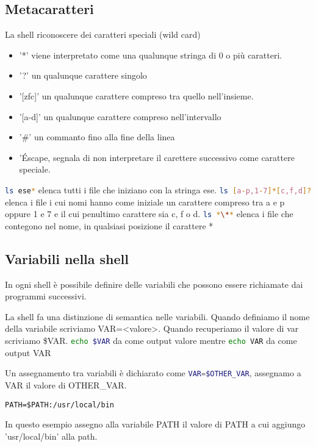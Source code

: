 \documentclass
[10pt,        %
 a4paper,     %
 onecolumn,   %
 fleqn,       %
 oneside,     %
 notitlepage, %
 openany      %
]{article}    %
\begin{document}
\subsection{Metacaratteri}
La shell riconoscere dei caratteri speciali (wild card)
\begin{itemize}
    \item '*' viene interpretato come una qualunque stringa di 0 o più caratteri.
    \item '?' un qualunque carattere singolo
    \item '[zfc]' un qualunque carattere compreso tra quello nell'insieme.
    \item '[a-d]' un qualunque carattere compreso nell'intervallo
    \item '\#' un commanto fino alla fine della linea
    \item '\' Escape, segnala di non interpretare il carettere successivo come carattere speciale. 
\end{itemize}
\lstinline[language=bash]!ls ese*! elenca tutti i file che iniziano con la stringa ese.
\lstinline[language=bash]!ls [a-p,1-7]*[c,f,d]?! elenca i file i cui nomi hanno come iniziale un carattere compreso tra a e p oppure 1 e 7 e il cui penultimo carattere sia c, f o d.
\lstinline[language=bash]!ls *\**! elenca i file che contegono nel nome, in qualsiasi posizione il carattere *

\subsection{Variabili nella shell}
In ogni shell è possibile definire delle variabili che possono essere richiamate dai programmi successivi.

La shell fa una distinzione di semantica nelle variabili. Quando definiamo il nome della variabile scriviamo VAR=<valore>. Quando recuperiamo il valore di var scriviamo \$VAR.
\lstinline[language=bash]!echo $VAR! da come output valore mentre \lstinline[language=bash]!echo VAR! da come output VAR

Un assegnamento tra variabili è dichiarato come \lstinline[language=bash]!VAR=$OTHER_VAR!, assegnamo a VAR il valore di OTHER\_VAR.

\begin{lstlisting}[name=Appendere una directory corrente alla PATH]
PATH=$PATH:/usr/local/bin
\end{lstlisting}
In questo esempio assegno alla variabile PATH il valore di PATH a cui aggiungo 'usr/local/bin' alla path.
\end{document}
